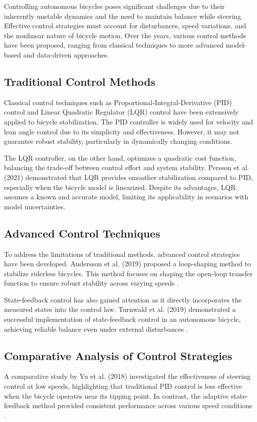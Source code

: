	Controlling autonomous bicycles poses significant challenges due to their inherently unstable dynamics and the need to maintain balance while steering. Effective control strategies must account for disturbances, speed variations, and the nonlinear nature of bicycle motion. Over the years, various control methods have been proposed, ranging from classical techniques to more advanced model-based and data-driven approaches.
	
	\subsection{Traditional Control Methods}
	Classical control techniques such as Proportional-Integral-Derivative (PID) control and Linear Quadratic Regulator (LQR) control have been extensively applied to bicycle stabilization. The PID controller is widely used for velocity and lean angle control due to its simplicity and effectiveness. However, it may not guarantee robust stability, particularly in dynamically changing conditions.
	
	The LQR controller, on the other hand, optimizes a quadratic cost function, balancing the trade-off between control effort and system stability. Persson et al. (2021) demonstrated that LQR provides smoother stabilization compared to PID, especially when the bicycle model is linearized\cite{persson2021}. Despite its advantages, LQR assumes a known and accurate model, limiting its applicability in scenarios with model uncertainties.
	
	\subsection{Advanced Control Techniques}
	To address the limitations of traditional methods, advanced control strategies have been developed. Andersson et al. (2019) proposed a loop-shaping method to stabilize riderless bicycles. This method focuses on shaping the open-loop transfer function to ensure robust stability across varying speeds \cite{andersson2019}.
	
	State-feedback control has also gained attention as it directly incorporates the measured states into the control law. Turnwald et al. (2019) demonstrated a successful implementation of state-feedback control in an autonomous bicycle, achieving reliable balance even under external disturbances \cite{turnwald2019}.
	
	\subsection{Comparative Analysis of Control Strategies}
	A comparative study by Yu et al. (2018) investigated the effectiveness of steering control at low speeds, highlighting that traditional PID control is less effective when the bicycle operates near its tipping point. In contrast, the adaptive state-feedback method provided consistent performance across various speed conditions \cite{yu2018}.
	
